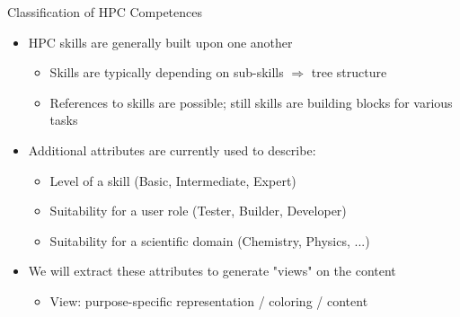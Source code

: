\documentclass[compress,aspectratio=169]{beamer}
\begin{document}
\begin{frame}{Classification of HPC Competences}
	\begin{itemize}
		\item HPC skills are generally built upon one another
		\begin{itemize}
			\item Skills are typically depending on sub-skills $\Rightarrow$ tree structure
			\item References to skills are possible; still skills are building blocks for various tasks
		\end{itemize}

		\item Additional attributes are currently used to describe:
		\begin{itemize}
			\item Level of a skill (Basic, Intermediate, Expert)
			\item Suitability for a user role (Tester, Builder, Developer)
			\item Suitability for a scientific domain (Chemistry, Physics, ...)
		\end{itemize}
		\item We will extract these attributes to generate "views" on the content
			\begin{itemize}
				\item View: purpose-specific representation / coloring / content
			\end{itemize}
	\end{itemize}
\end{frame}
\end{document}
